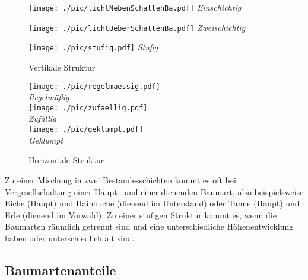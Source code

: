 \documentclass[twocolumn]{scrartcl}
\begin{document}
\begin{figure}[htbp]
  \centering
  \begin{minipage}{0.9\linewidth}
    \begin{minipage}{0.3\linewidth}
      \texttt{[image: ./pic/lichtNebenSchattenBa.pdf]}
      \textit{Einschichtig}
    \end{minipage}\hfill
    \begin{minipage}{0.65\linewidth}
      \texttt{[image: ./pic/lichtUeberSchattenBa.pdf]}
      \null\hfill\textit{Zweischichtig}
    \end{minipage}
  \end{minipage}
  \begin{minipage}{0.9\linewidth}
    \centering
    \texttt{[image: ./pic/stufig.pdf]}
    \textit{Stufig}
  \end{minipage}
  \caption{Vertikale Struktur}
  \label{fig:vertikaleStruktur}
\end{figure}

\begin{figure}[htbp]
  \centering
  \texttt{[image: ./pic/regelmaessig.pdf]}\\
  \textit{Regelmäßig}\\[.5em]
  \texttt{[image: ./pic/zufaellig.pdf]}\\
  \textit{Zufällig}\\[.5em]
  \texttt{[image: ./pic/geklumpt.pdf]}\\
  \textit{Geklumpt}
  \caption{Horizontale Struktur}
  \label{fig:horizontaletruktur}
\end{figure}

Zu einer Mischung in zwei Bestandesschichten kommt es oft bei
Vergesellschaftung einer Haupt-- und einer dienenden Baumart, also
beispielsweise Eiche (Haupt) und Hainbuche (dienend im Unterstand)
oder Tanne (Haupt) und Erle (dienend im Vorwald). Zu einer stufigen
Struktur kommt es, wenn die Baumarten räumlich getrennt sind und eine
unterschiedliche Höhenentwicklung haben oder unterschiedlich alt sind.

\subsection{Baumartenanteile}
\label{ssec:Baumartenanteile}
\end{document}
